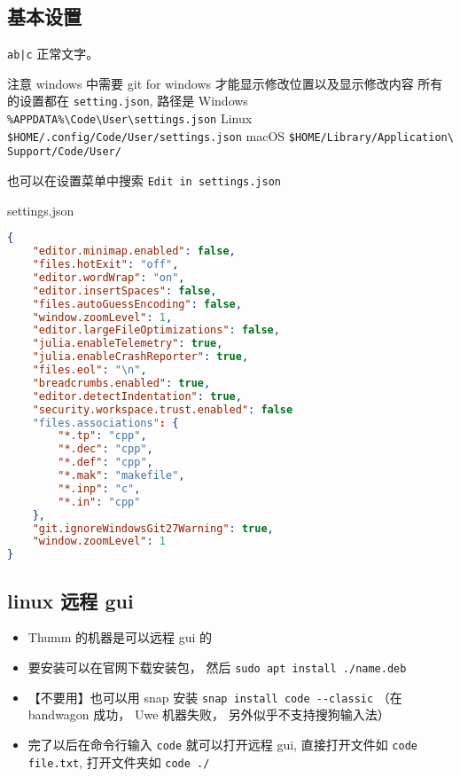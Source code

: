 
\subsection{基本设置}

\verb`ab|c` 正常文字。

注意 windows 中需要 git for windows 才能显示修改位置以及显示修改内容
所有的设置都在 \verb`setting.json`, 路径是
Windows \verb`%APPDATA%\Code\User\settings.json`
Linux \verb`$HOME/.config/Code/User/settings.json`
macOS \verb`$HOME/Library/Application\ Support/Code/User/`

也可以在设置菜单中搜索 \verb`Edit in settings.json`

settings.json

\begin{lstlisting}[language=json]
{
	"editor.minimap.enabled": false,
	"files.hotExit": "off",
	"editor.wordWrap": "on",
    "editor.insertSpaces": false,
	"files.autoGuessEncoding": false,
	"window.zoomLevel": 1,
	"editor.largeFileOptimizations": false,
	"julia.enableTelemetry": true,
	"julia.enableCrashReporter": true,
	"files.eol": "\n",
	"breadcrumbs.enabled": true,
	"editor.detectIndentation": true,
	"security.workspace.trust.enabled": false
	"files.associations": {
		"*.tp": "cpp",
		"*.dec": "cpp",
		"*.def": "cpp",
		"*.mak": "makefile",
		"*.inp": "c",
		"*.in": "cpp"
	},
	"git.ignoreWindowsGit27Warning": true,
	"window.zoomLevel": 1
}
\end{lstlisting}


\subsection{linux 远程 gui}
\begin{itemize}
\item Thumm 的机器是可以远程 gui 的
\item 要安装可以在官网下载安装包， 然后 \verb`sudo apt install ./name.deb`
\item 【不要用】也可以用 snap 安装 \verb`snap install code --classic` （在 bandwagon 成功， Uwe 机器失败， 另外似乎不支持搜狗输入法）
\item 完了以后在命令行输入 \verb`code` 就可以打开远程 gui, 直接打开文件如 \verb`code file.txt`, 打开文件夹如 \verb`code ./`
\end{itemize}
